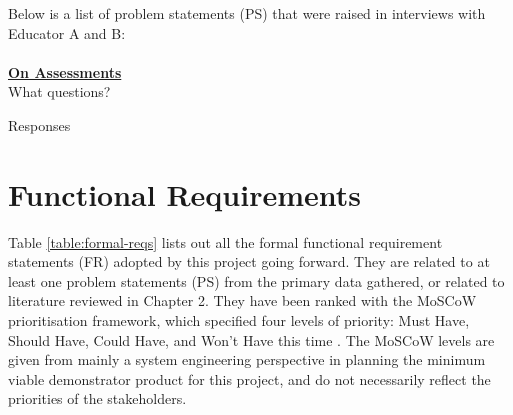 Below is a list of problem statements (PS) that were raised in interviews with Educator A and B:\\
\\
\underline{\textbf{On Assessments}}
\\
What questions?

Responses

\section{Functional Requirements}

Table \ref{table:formal-reqs} lists out all the formal functional requirement statements (FR) adopted by this 
project going forward. They are related to at least one problem statements (PS) from the primary data 
gathered, or related to literature reviewed in Chapter 2. They have been ranked with the MoSCoW prioritisation
framework, which specified four levels of priority: Must Have, Should Have, Could Have, and Won’t Have 
this time \citep{agile2018moscow}. The MoSCoW levels are given from mainly a system engineering perspective 
in planning the minimum viable demonstrator product for this project, and do not necessarily reflect 
the priorities of the stakeholders.

